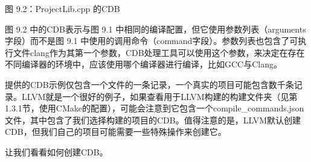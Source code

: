 \begin{center}
图 9.2：ProjectLib.cpp 的CDB
\end{center}

图 9.2 中的CDB表示与图 9.1 中相同的编译配置，但它使用参数列表（arguments字段）而不是图 9.1 中使用的调用命令（command字段）。参数列表也包含了可执行文件clang作为其第一个参数，CDB处理工具可以使用这个参数，来决定在存在不同编译器的环境中，应该使用哪个编译器进行编译，比如GCC与Clang。

提供的CDB示例仅包含一个文件的一条记录，一个真实的项目可能包含数千条记录。LLVM就是一个很好的例子，如果查看用于LLVM构建的构建文件夹（见第1.3.1节，使用CMake的配置），可能会注意到它包含一个compile\_commands.json文件，其中包含了我们选择构建的项目的CDB。值得注意的是，LLVM默认创建CDB，但我们自己的项目可能需要一些特殊操作来创建它。

让我们看看如何创建CDB。
